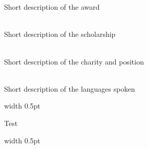 \documentclass[12pt, a4paper, conference]{IEEEtran}
\newcommand{\borderthickness}{0.5pt}
\begin{document}
\noindent\makebox[0cm]{\textcolor{bordercolour}{\rule{15.76cm}{\borderthickness}}}

\begin{minipage}[t][5cm][t]{0.38\textwidth}
{}\\

\begin{flushright}
{}\\
Short description of the award\\
\end{flushright}

\begin{flushright}
{}\\
Short description of the scholarship\\
\end{flushright}

\begin{flushright}
{}\\
Short description of the charity and position\\
\end{flushright}

\begin{flushright}
{}\\
Short description of the languages spoken\\
\end{flushright}

\end{minipage}
\quad
\textcolor{bordercolour}{\vrule height 3ex width \borderthickness}
\quad
	
\begin{minipage}[t][4cm][t]{0.38\textwidth}
\color{white}Test
\end{minipage}
\quad
\textcolor{bordercolour}{\vrule height 1ex width \borderthickness}
\quad

\noindent\makebox[\linewidth]{\textcolor{bordercolour}{\rule{\paperwidth}{\borderthickness}}}

\begin{center}
{}
\end{center}
\end{document}

